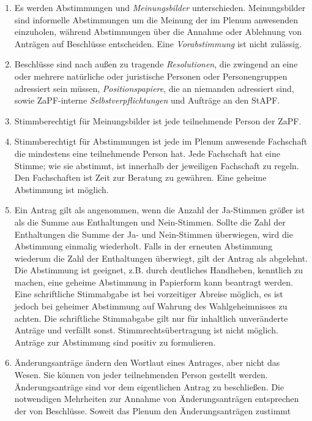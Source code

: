 \documentclass[
  ngerman,
  a4paper,
  oneside]{scrartcl}
\providecommand{\tightlist}{%
  \setlength{\itemsep}{0pt}\setlength{\parskip}{0pt}}
\begin{document}
\begin{enumerate}
\def\labelenumi{\arabic{enumi}.}
\tightlist
\item
  Es werden Abstimmungen und \emph{Meinungsbilder} unterschieden.
  Meinungsbilder sind informelle Abstimmungen um die Meinung der im
  Plenum anwesenden einzuholen, während Abstimmungen über die Annahme
  oder Ablehnung von Anträgen auf Beschlüsse entscheiden. Eine
  \emph{Vorabstimmung} ist nicht zulässig.
\item
  Beschlüsse sind nach außen zu tragende \emph{Resolutionen}, die
  zwingend an eine oder mehrere natürliche oder juristische Personen
  oder Personengruppen adressiert sein müssen, \emph{Positionspapiere},
  die an niemanden adressiert sind, sowie ZaPF-interne
  \emph{Selbstverpflichtungen} und Aufträge an den StAPF.
\item
  Stimmberechtigt für Meinungsbilder ist jede teilnehmende Person der
  ZaPF.
\item
  Stimmberechtigt für Abstimmungen ist jede im Plenum anwesende
  Fachschaft die mindestens eine teilnehmende Person hat. Jede
  Fachschaft hat eine Stimme; wie sie abstimmt, ist innerhalb der
  jeweiligen Fachschaft zu regeln. Den Fachschaften ist Zeit zur
  Beratung zu gewähren. Eine geheime Abstimmung ist möglich.
\item
  Ein Antrag gilt als angenommen, wenn die Anzahl der Ja-Stimmen größer
  ist als die Summe aus Enthaltungen und Nein-Stimmen. Sollte die Zahl
  der Enthaltungen die Summe der Ja- und Nein-Stimmen überwiegen, wird
  die Abstimmung einmalig wiederholt. Falls in der erneuten Abstimmung
  wiederum die Zahl der Enthaltungen überwiegt, gilt der Antrag als
  abgelehnt. Die Abstimmung ist geeignet, z.B. durch deutliches
  Handheben, kenntlich zu machen, eine geheime Abstimmung in Papierform
  kann beantragt werden. Eine schriftliche Stimmabgabe ist bei
  vorzeitiger Abreise möglich, es ist jedoch bei geheimer Abstimmung auf
  Wahrung des Wahlgeheimnisses zu achten. Die schriftliche Stimmabgabe
  gilt nur für inhaltlich unveränderte Anträge und verfällt sonst.
  Stimmrechtsübertragung ist nicht möglich. Anträge zur Abstimmung sind
  positiv zu formulieren.
\item
  Änderungsanträge ändern den Wortlaut eines Antrages, aber nicht das
  Wesen. Sie können von jeder teilnehmenden Person gestellt werden.
  Änderungsanträge sind vor dem eigentlichen Antrag zu beschließen. Die
  notwendigen Mehrheiten zur Annahme von Änderungsanträgen entsprechen
  der von Beschlüsse. Soweit das Plenum den Änderungsanträgen zustimmt

\end{enumerate}
\end{document}
